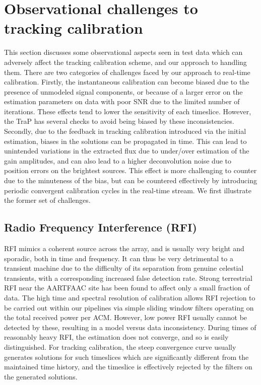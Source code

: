 \documentclass{aa}
\begin{document}
\section{\label{sec:Challenges-to-tracking}Observational challenges to tracking calibration}
This section  discusses some observational aspects  seen in test  data which can
adversely affect the  tracking calibration scheme, and our  approach to handling
them.  There are two categories of challenges faced by our approach to real-time
calibration. Firstly, the instantaneous calibration can become biased due to the
presence of  unmodeled signal components,  or because of  a larger error  on the
estimation  parameters on  data  with poor  SNR  due to  the  limited number  of
iterations.   These effects  tend to  lower the  sensitivity of  each timeslice.
However,  the  TraP   has  several  checks  to  avoid   being  biased  by  these
inconsistencies.   Secondly,  due  to   the  feedback  in  tracking  calibration
introduced via the initial estimation, biases in the solutions can be propagated
in time.   This can lead to unintended  variations in the extracted  flux due to
under/over estimation  of the  gain amplitudes,  and can also  lead to  a higher
deconvolution noise due to position errors on the brightest sources. This effect
is more  challenging to counter due  to the minuteness  of the bias, but  can be
countered effectively  by introducing periodic convergent  calibration cycles in
the real-time stream. We first illustrate the former set of challenges.

\subsection{Radio Frequency Interference (RFI)}

RFI mimics  a coherent source across the  array, and is usually  very bright and
sporadic, both in  time and frequency. It  can thus be very  detrimental to a
transient machine due to the difficulty of its separation from genuine celestial
transients,  with  a  corresponding  increased  false  detection  rate.   Strong
terrestrial RFI  near the AARTFAAC  site has been  found to affect only  a small
fraction of  data. The high time  and spectral resolution  of calibration allows
RFI rejection to  be carried out within our pipelines  via simple sliding window
filters operating on  the total received power per ACM.   However, low power RFI
usually  cannot  be  detected  by  these,  resulting  in  a  model  versus  data
inconsistency.  During  times of reasonably  heavy RFI, the estimation  does not
converge, and so  is easily distinguished.  For tracking  calibration, the steep
convergence  curve usually  generates solutions  for such  timeslices  which are
significantly different from  the maintained time history, and  the timeslice is
effectively  rejected by the  filters on  the generated  solutions.  
\end{document}
